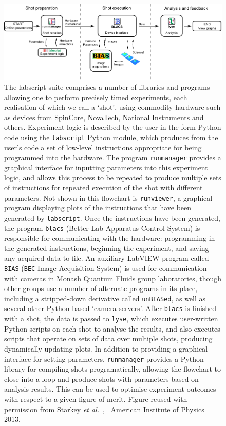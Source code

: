 \begin{figure}
\begin{center}
\includegraphics[width=\textwidth]{figures/software/flow_chart_simple-eps-converted-to.pdf}
\caption{The labscript suite comprises a number of libraries and programs allowing one to perform precisely timed experiments, each realisation of which we call a `shot', using commodity hardware such as devices from SpinCore, NovaTech, National Instruments and others. Experiment logic is described by the user in the form Python code using the \texttt{labscript} Python module, which produces from the user's code a set of low-level instructions appropriate for being programmed into the hardware. The program \texttt{runmanager} provides a graphical interface for inputting parameters into this experiment logic, and allows this process to be repeated to produce multiple sets of instructions for repeated execution of the shot with different parameters. Not shown in this flowchart is \texttt{runviewer}, a graphical program displaying plots of the instructions that have been generated by \texttt{labscript}. Once the instructions have been generated, the program \texttt{blacs} (Better Lab Apparatus Control System) is responsible for communicating with the hardware: programming in the generated instructions, beginning the experiment, and saving any acquired data to file. An auxiliary LabVIEW program called \texttt{BIAS} (\texttt{BEC} Image Acquisition System) is used for communication with cameras in Monash Quantum Fluids group laboratories, though other groups use a number of alternate programs in its place, including a stripped-down derivative called \texttt{unBIASed}, as well as several other Python-based `camera servers'. After \texttt{blacs} is finished with a shot, the data is passed to \texttt{lyse}, which executes user-written Python scripts on each shot to analyse the results, and also executes scripts that operate on sets of data over multiple shots, producing dynamically updating plots. In addition to providing a graphical interface for setting parameters, \texttt{runmanager} provides a Python library for compiling shots programatically, allowing the flowchart to close into a loop and produce shots with parameters based on analysis results. This can be used to optimise experiment outcomes with respect to a given figure of merit. Figure reused with permission from Starkey \emph{\emph{et al.}}~\cite{starkey_scripted_2013}, \textcopyright\ American Institute of Physics 2013.}\label{fig:labscript_flowchart}
\end{center}
\end{figure}

